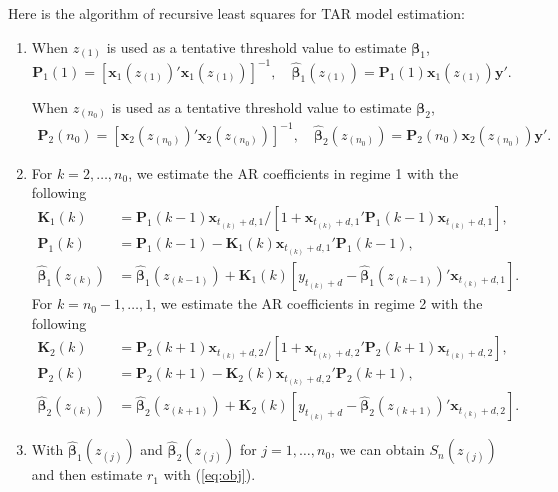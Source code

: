 Here is the algorithm of recursive least squares for TAR model estimation:
\begin{enumerate}
\item When ${z}_{(1)}$ is used as a tentative threshold value to estimate $\boldsymbol{\beta}_1$,
\[
{\mathbf P}_1(1)=[{\mathbf x}_1({z}_{(1)})' {\mathbf x}_1({z}_{(1)})]^{-1}, \quad \hat{\boldsymbol{\beta}}_1({z}_{(1)})={\mathbf P}_1(1) {\mathbf x}_1({z}_{(1)}){\mathbf y}'.
\]

When ${z}_{(n_0)}$ is used as a tentative threshold value to estimate $\boldsymbol{\beta}_2$,
\begin{align*}
{\mathbf P}_2(n_0)=[{\mathbf x}_{2}({z}_{(n_0)})' {\mathbf x}_2({z}_{(n_0)})]^{-1}, \quad  \hat{\boldsymbol{\beta}}_2({z}_{(n_0)})={\mathbf P}_2({n_0}){\mathbf x}_{2}({z}_{(n_0)}){\mathbf y}'.
\end{align*}
\item For $k=2,\ldots,n_0$, we estimate the AR coefficients in regime 1 with the following
\begin{align*}
{\mathbf K}_1({k})&={\mathbf P}_1(k-1) {\mathbf x}_{t_{(k)}+d,1}/[1+{\mathbf x}_{t_{(k)}+d,1}'{\mathbf P}_1(k-1){\mathbf x}_{t_{(k)}+d,1}], \\
{\mathbf P}_1(k)&={\mathbf P}_1(k-1)-{\mathbf K}_1(k) {\mathbf x}_{t_{(k)}+d,1}' {\mathbf P}_1(k-1),\\
\hat{\boldsymbol{\beta}}_1({z}_{(k)})&=\hat{\boldsymbol{\beta}}_1({z}_{(k-1)})+{\mathbf K}_1(k)[y_{t_{(k)}+d}- \hat{\boldsymbol{\beta}}_1(z_{(k-1)})'{\mathbf x}_{t_{(k)}+d,1}].
\end{align*}
For $k=n_0-1,\ldots,1$, we estimate the AR coefficients in regime 2 with the following
\begin{align*}
{\mathbf K}_2({k})&={\mathbf P}_2(k+1) {\mathbf x}_{t_{(k)}+d,2}/[1+{\mathbf x}_{t_{(k)}+d,2}'{\mathbf P}_2(k+1){\mathbf x}_{t_{(k)}+d,2}], \\
{\mathbf P}_2(k)&={\mathbf P}_2(k+1)-{\mathbf K}_2(k) {\mathbf x}_{t_{(k)}+d,2}' {\mathbf P}_2(k+1),\\
\hat{\boldsymbol{\beta}}_2({z}_{(k)})&=\hat{\boldsymbol{\beta}}_2({z}_{(k+1)})+{\mathbf K}_2(k)[y_{t_{(k)}+d}- \hat{\boldsymbol{\beta}}_2(z_{(k+1)})'{\mathbf x}_{t_{(k)}+d,2}].
\end{align*}
\item With $\hat{\boldsymbol{\beta}}_1(z_{(j)})$ and $\hat{\boldsymbol{\beta}}_2(z_{(j)})$ for $j=1,\ldots, n_0$, we can obtain $S_n(z_{(j)})$ and then estimate $r_1$ with (\ref{eq:obj}).
\end{enumerate}



